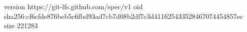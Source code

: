 version https://git-lfs.github.com/spec/v1
oid sha256:cf6cfde876beb5c6fbd93ad7cb7d08b2df7c3d411625433528467074454857ec
size 221283
